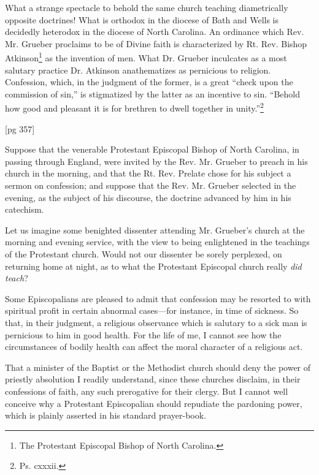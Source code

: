 What a strange spectacle to behold the same
church teaching diametrically opposite doctrines!
What is orthodox in the diocese of Bath and Wells
is decidedly heterodox in the diocese of North Carolina.
An ordinance which Rev. Mr. Grueber proclaims
to be of Divine faith is characterized by Rt.
Rev. Bishop Atkinson\footnote{The Protestant
Episcopal Bishop of North Carolina.} as the invention of men.
What Dr. Grueber inculcates as a most salutary
practice Dr. Atkinson anathematizes as pernicious
to religion. Confession, which, in the judgment of
the former, is a great “check upon the commission
of sin,” is stigmatized by the latter as an incentive
to sin. “Behold how good and pleasant it is for
brethren to dwell together in unity.”\footnote{Ps. cxxxii.}

[pg 357]

Suppose that the venerable Protestant Episcopal
Bishop of North Carolina, in passing through
England, were invited by the Rev. Mr. Grueber to
preach in his church in the morning, and that the
Rt. Rev. Prelate chose for his subject a sermon
on confession; and suppose that the Rev. Mr. Grueber
selected in the evening, as the subject of his
discourse, the doctrine advanced by him in his
catechism.

Let us imagine some benighted dissenter attending
Mr. Grueber's church at the morning and evening
service, with the view to being enlightened in
the teachings of the Protestant church. Would
not our dissenter be sorely perplexed, on returning
home at night, as to what the Protestant Episcopal
church really \emph{did teach}?

Some Episcopalians are pleased to admit that
confession may be resorted to with spiritual profit
in certain abnormal cases—for instance, in time of
sickness. So that, in their judgment, a religious
observance which is salutary to a sick man is
pernicious to him in good health. For the life of
me, I cannot see how the circumstances of bodily
health can affect the moral character of a religious
act.

That a minister of the Baptist or the Methodist
church should deny the power of priestly absolution
I readily understand, since these churches disclaim,
in their confessions of faith, any such prerogative
for their clergy. But I cannot well conceive
why a Protestant Episcopalian should repudiate
the pardoning power, which is plainly asserted
in his standard prayer-book.

